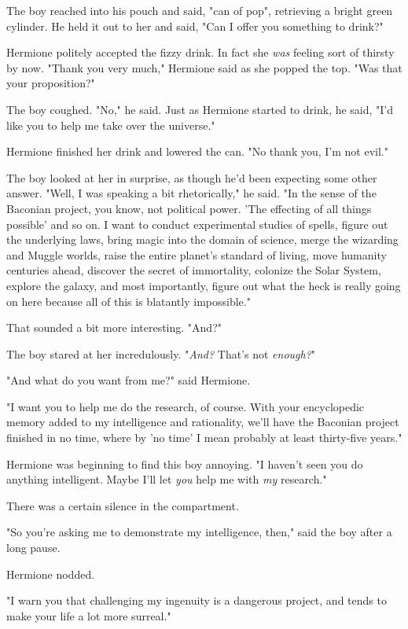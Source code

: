The boy reached into his pouch and said, "can of pop", retrieving a bright 
green cylinder. He held it out to her and said, "Can I offer you something to 
drink?"

Hermione politely accepted the fizzy drink. In fact she \emph{was} feeling sort 
of thirsty by now. "Thank you very much," Hermione said as she popped the top. 
"Was that your proposition?"

The boy coughed. "No," he said. Just as Hermione started to drink, he said, 
"I'd like you to help me take over the universe."

Hermione finished her drink and lowered the can. "No thank you, I'm not evil."

The boy looked at her in surprise, as though he'd been expecting some other 
answer. "Well, I was speaking a bit rhetorically," he said. "In the sense of 
the Baconian project, you know, not political power. 'The effecting of all 
things possible' and so on. I want to conduct experimental studies of spells, 
figure out the underlying laws, bring magic into the domain of science, merge 
the wizarding and Muggle worlds, raise the entire planet's standard of living, 
move humanity centuries ahead, discover the secret of immortality, colonize the 
Solar System, explore the galaxy, and most importantly, figure out what the 
heck is really going on here because all of this is blatantly impossible."

That sounded a bit more interesting. "And?"

The boy stared at her incredulously. "\emph{And?} That's not \emph{enough?}"

"And what do you want from me?" said Hermione.

"I want you to help me do the research, of course. With your encyclopedic 
memory added to my intelligence and rationality, we'll have the Baconian 
project finished in no time, where by 'no time' I mean probably at least 
thirty-five years."

Hermione was beginning to find this boy annoying. "I haven't seen you do 
anything intelligent. Maybe I'll let \emph{you} help me with \emph{my} 
research."

There was a certain silence in the compartment.

"So you're asking me to demonstrate my intelligence, then," said the boy after 
a long pause.

Hermione nodded.

"I warn you that challenging my ingenuity is a dangerous project, and tends to 
make your life a lot more surreal."


